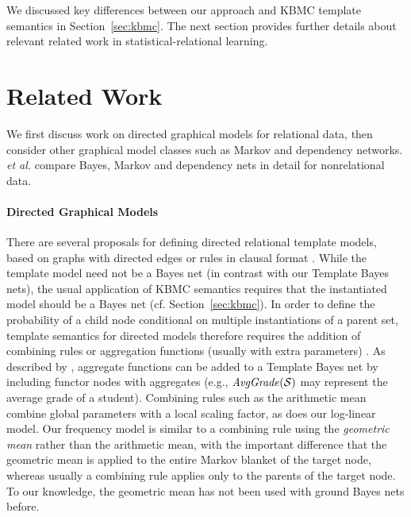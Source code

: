 \documentclass[twoside,11pt]{article}
\begin{document}
We discussed key differences between our approach and KBMC template semantics in Section~\ref{sec:kbmc}. The next section provides further details about relevant related work in statistical-relational learning. 







\section{Related Work} \label{sec:related} We first discuss work on directed graphical  models for relational data, then consider other graphical model classes such as Markov and dependency networks. \cite{Heckerman2000} {\em et al.} compare Bayes, Markov and dependency nets in detail for nonrelational data. 

\paragraph{Directed Graphical Models} There are several proposals for defining directed relational template models, based on graphs with directed edges or rules in clausal format \cite{Kersting2007,Getoor2007c,Fierens2009,Milch2007}. While the template model need not be a Bayes net (in contrast with our Template Bayes nets), the usual application of KBMC semantics requires that the instantiated model should be a Bayes net (cf. Section~\ref{sec:kbmc}). 
In order to define the probability of a child node conditional on multiple instantiations of a parent set, template semantics for directed models therefore requires the addition of combining rules \cite{Kersting2007} or aggregation functions (usually with extra parameters) \cite{Getoor2007c}. As described by \cite{Kersting2007}, aggregate functions can be added to a Template Bayes net by including functor nodes with aggregates (e.g., $\it{AvgGrade}(\S)$ may represent the average grade of a student). Combining rules such as the arithmetic mean~\cite{Natarajan2010} combine global parameters with a local scaling factor, as does our log-linear model. 
Our frequency model is similar to a combining rule using the {\em geometric mean} rather than the arithmetic mean, with
the important difference 
that the geometric mean is applied to the entire Markov blanket of the target node, whereas usually a combining rule applies only to the parents of the target node. To our knowledge, the geometric mean has not been used with ground Bayes nets before.
\end{document}
